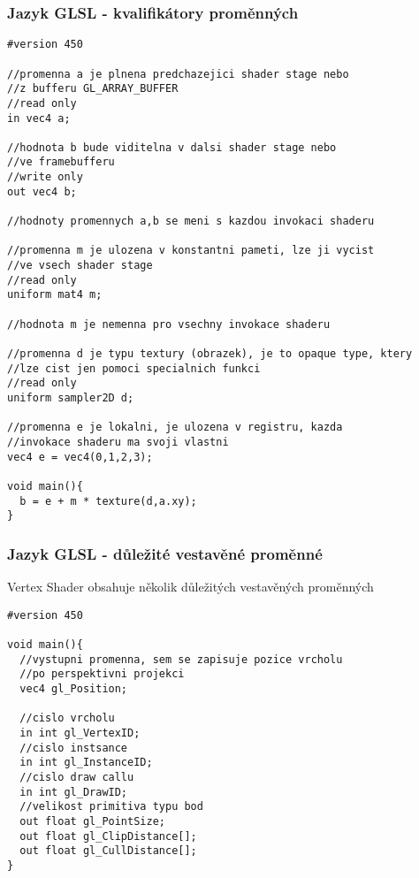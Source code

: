 \begin{frame}[fragile]
\frametitle{Jazyk GLSL - kvalifikátory proměnných}
{\tiny
\begin{verbatim}
#version 450

//promenna a je plnena predchazejici shader stage nebo
//z bufferu GL_ARRAY_BUFFER
//read only
in vec4 a;

//hodnota b bude viditelna v dalsi shader stage nebo
//ve framebufferu
//write only
out vec4 b;

//hodnoty promennych a,b se meni s kazdou invokaci shaderu

//promenna m je ulozena v konstantni pameti, lze ji vycist 
//ve vsech shader stage
//read only
uniform mat4 m;

//hodnota m je nemenna pro vsechny invokace shaderu

//promenna d je typu textury (obrazek), je to opaque type, ktery
//lze cist jen pomoci specialnich funkci
//read only
uniform sampler2D d;

//promenna e je lokalni, je ulozena v registru, kazda 
//invokace shaderu ma svoji vlastni
vec4 e = vec4(0,1,2,3);

void main(){
  b = e + m * texture(d,a.xy);
}
\end{verbatim}
}
\end{frame}

\begin{frame}[fragile]
\frametitle{Jazyk GLSL - důležité vestavěné proměnné}
Vertex Shader obsahuje několik důležitých vestavěných proměnných
{\scriptsize
\begin{verbatim}
#version 450

void main(){
  //vystupni promenna, sem se zapisuje pozice vrcholu
  //po perspektivni projekci
  vec4 gl_Position;

  //cislo vrcholu
  in int gl_VertexID;
  //cislo instsance
  in int gl_InstanceID;
  //cislo draw callu
  in int gl_DrawID;
  //velikost primitiva typu bod
  out float gl_PointSize;
  out float gl_ClipDistance[];
  out float gl_CullDistance[];
}

\end{verbatim}
}
\end{frame}

